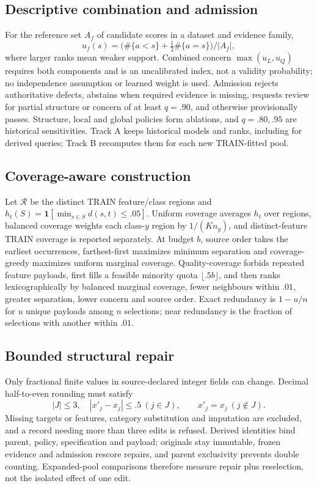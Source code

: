 \subsection{Descriptive combination and admission}
For the reference set $A_f$ of candidate scores in a dataset and evidence family,
\begin{equation}
u_f(s)=\bigl(\#\{a<s\}+\tfrac12\#\{a=s\}\bigr)/|A_f|,
\end{equation}
where larger ranks mean weaker support. Combined concern $\max(u_L,u_Q)$ requires both components and is an uncalibrated index, not a validity probability; no independence assumption or learned weight is used. Admission rejects authoritative defects, abstains when required evidence is missing, requests review for partial structure or concern of at least $q=.90$, and otherwise provisionally passes. Structure, local and global policies form ablations, and $q=.80,.95$ are historical sensitivities. Track A keeps historical models and ranks, including for derived queries; Track B recomputes them for each new TRAIN-fitted pool.

\subsection{Coverage-aware construction}
Let $\mathcal R$ be the distinct TRAIN feature/class regions and $h_t(S)=\mathbf1[\min_{s\in S}d(s,t)\le .05]$. Uniform coverage averages $h_t$ over regions, balanced coverage weights each class-$y$ region by $1/(K n_y)$, and distinct-feature TRAIN coverage is reported separately. At budget $b$, source order takes the earliest occurrences, farthest-first maximizes minimum separation and coverage-greedy maximizes uniform marginal coverage. Quality-coverage forbids repeated feature payloads, first fills a feasible minority quota $\lfloor .5b\rfloor$, and then ranks lexicographically by balanced marginal coverage, fewer neighbours within $.01$, greater separation, lower concern and source order. Exact redundancy is $1-u/n$ for $u$ unique payloads among $n$ selections; near redundancy is the fraction of selections with another within $.01$.

\subsection{Bounded structural repair}
Only fractional finite values in source-declared integer fields can change. Decimal half-to-even rounding must satisfy
\begin{equation}
|J|\le3,\quad |x'_j-x_j|\le .5\ (j\in J),\qquad x'_j=x_j\ (j\notin J).
\end{equation}
Missing targets or features, category substitution and imputation are excluded, and a record needing more than three edits is refused. Derived identities bind parent, policy, specification and payload; originals stay immutable, frozen evidence and admission rescore repairs, and parent exclusivity prevents double counting. Expanded-pool comparisons therefore measure repair plus reselection, not the isolated effect of one edit.
